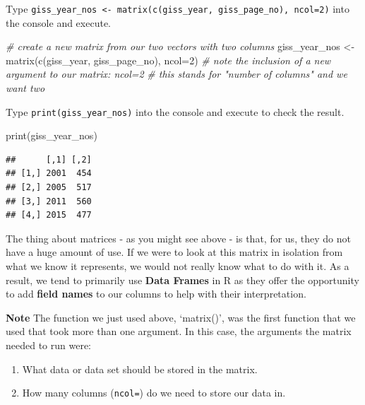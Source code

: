 \documentclass[
]{book}
\newenvironment{Shaded}{\begin{snugshade}}{\end{snugshade}}
\newcommand{\AttributeTok}[1]{\textcolor[rgb]{0.77,0.63,0.00}{#1}}
\newcommand{\CommentTok}[1]{\textcolor[rgb]{0.56,0.35,0.01}{\textit{#1}}}
\newcommand{\DecValTok}[1]{\textcolor[rgb]{0.00,0.00,0.81}{#1}}
\newcommand{\FunctionTok}[1]{\textcolor[rgb]{0.00,0.00,0.00}{#1}}
\newcommand{\NormalTok}[1]{#1}
\newcommand{\OtherTok}[1]{\textcolor[rgb]{0.56,0.35,0.01}{#1}}
\providecommand{\tightlist}{%
  \setlength{\itemsep}{0pt}\setlength{\parskip}{0pt}}
\begin{document}
Type \texttt{giss\_year\_nos\ \textless{}-\ matrix(c(giss\_year,\ giss\_page\_no),\ ncol=2)} into the console and execute.

\begin{Shaded}
\begin{Highlighting}[]
\CommentTok{\# create a new matrix from our two vectors with two columns}
\NormalTok{giss\_year\_nos }\OtherTok{\textless{}{-}} \FunctionTok{matrix}\NormalTok{(}\FunctionTok{c}\NormalTok{(giss\_year, giss\_page\_no), }\AttributeTok{ncol=}\DecValTok{2}\NormalTok{)}
\CommentTok{\# note the inclusion of a new argument to our matrix: ncol=2}
\CommentTok{\# this stands for "number of columns" and we want two}
\end{Highlighting}
\end{Shaded}

Type \texttt{print(giss\_year\_nos)} into the console and execute to check the result.

\begin{Shaded}
\begin{Highlighting}[]
\FunctionTok{print}\NormalTok{(giss\_year\_nos)}
\end{Highlighting}
\end{Shaded}

\begin{verbatim}
##      [,1] [,2]
## [1,] 2001  454
## [2,] 2005  517
## [3,] 2011  560
## [4,] 2015  477
\end{verbatim}

The thing about matrices - as you might see above - is that, for us, they do not have a huge amount of use. If we were to look at this matrix in isolation from what we know it represents, we would not really know what to do with it. As a result, we tend to primarily use \textbf{Data Frames} in R as they offer the opportunity to add \textbf{field names} to our columns to help with their interpretation.

\textbf{Note}
The function we just used above, `matrix()', was the first function that we used that took more than one argument.
In this case, the arguments the matrix needed to run were:

\begin{enumerate}
\def\labelenumi{\arabic{enumi}.}
\tightlist
\item
  What data or data set should be stored in the matrix.
\item
  How many columns (\texttt{ncol=}) do we need to store our data in.
\end{enumerate}
\end{document}

